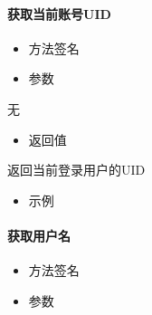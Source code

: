 \documentclass[letterpaper,10pt,english]{sphinxmanual}
\begin{document}
\paragraph{获取当前账号UID}
\label{\detokenize{csharp:uid}}\begin{itemize}
\item {} 
方法签名

\end{itemize}

%
\begin{sphinxVerbatim}[commandchars=\\\{\}]
  
\end{sphinxVerbatim}
\begin{itemize}
\item {} 
参数

\end{itemize}

无
\begin{itemize}
\item {} 
返回值

\end{itemize}

返回当前登录用户的UID
\begin{itemize}
\item {} 
示例

\end{itemize}

%
\begin{sphinxVerbatim}[commandchars=\\\{\}]
   
   
\end{sphinxVerbatim}


\paragraph{获取用户名}
\label{\detokenize{csharp:id17}}\begin{itemize}
\item {} 
方法签名

\end{itemize}

%
\begin{sphinxVerbatim}[commandchars=\\\{\}]
  
\end{sphinxVerbatim}
\begin{itemize}
\item {} 
参数

\end{itemize}
\end{document}
